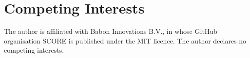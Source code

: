 \section*{Competing Interests}\label{competing-interests}

The author is affiliated with Babon Innovations B.V., in whose GitHub organisation SCORE is published under the MIT licence. The author declares no competing interests.

